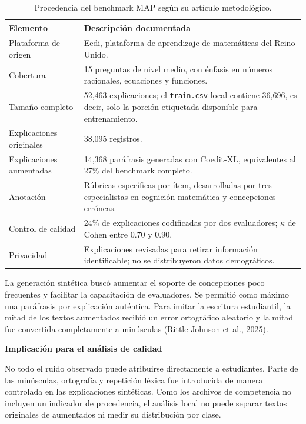 \documentclass[11pt,oneside,openany]{book}
\newenvironment{advertencia}[1][]{%
  \begin{lrbox}{\infobox}\begin{minipage}{0.92\textwidth}
  \color{GrisTexto}\sffamily\textbf{#1}\par\smallskip\rmfamily}
  {\end{minipage}\end{lrbox}\par\medskip\noindent
   \colorbox{AmarilloClaro}{\usebox{\infobox}}\par\medskip}
\newcommand{\codigo}[1]{\texttt{#1}}
\begin{document}
\begin{table}[htbp]
\centering
\caption{Procedencia del benchmark MAP según su artículo metodológico.}
\label{tab:procedencia-benchmark}
\begin{tabularx}{\textwidth}{@{}p{4.5cm}Y@{}}
\toprule
\textbf{Elemento} & \textbf{Descripción documentada}\\
\midrule
Plataforma de origen & Eedi, plataforma de aprendizaje de matemáticas del Reino
Unido.\\
Cobertura & 15 preguntas de nivel medio, con énfasis en números racionales,
ecuaciones y funciones.\\
Tamaño completo & 52,463 explicaciones; el \codigo{train.csv} local contiene
36,696, es decir, solo la porción etiquetada disponible para entrenamiento.\\
Explicaciones originales & 38,095 registros.\\
Explicaciones aumentadas & 14,368 paráfrasis generadas con Coedit-XL, equivalentes
al 27\% del benchmark completo.\\
Anotación & Rúbricas específicas por ítem, desarrolladas por tres especialistas
en cognición matemática y concepciones erróneas.\\
Control de calidad & 24\% de explicaciones codificadas por dos evaluadores;
\(\kappa\) de Cohen entre 0.70 y 0.90.\\
Privacidad & Explicaciones revisadas para retirar información identificable; no
se distribuyeron datos demográficos.\\
\bottomrule
\end{tabularx}
\end{table}

La generación sintética buscó aumentar el soporte de concepciones poco
frecuentes y facilitar la capacitación de evaluadores. Se permitió como máximo
una paráfrasis por explicación auténtica. Para imitar la escritura estudiantil,
la mitad de los textos aumentados recibió un error ortográfico aleatorio y la
mitad fue convertida completamente a minúsculas (Rittle-Johnson et al., 2025).

\begin{advertencia}[Implicación para el análisis de calidad]
No todo el ruido observado puede atribuirse directamente a estudiantes. Parte
de las minúsculas, ortografía y repetición léxica fue introducida de manera
controlada en las explicaciones sintéticas. Como los archivos de competencia no
incluyen un indicador de procedencia, el análisis local no puede separar textos
originales de aumentados ni medir su distribución por clase.
\end{advertencia}
\end{document}
